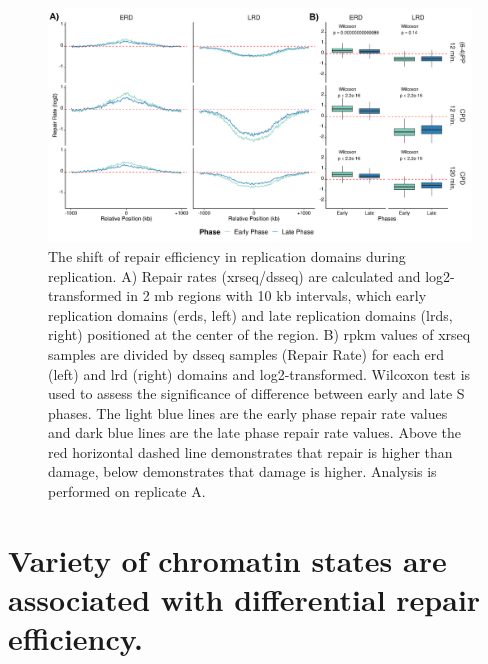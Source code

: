 \begin{figure}[H]
    \begin{center}
    \includegraphics[width=\textwidth]{Chapters/4_results/figures/fig2}
    \caption[The shift of repair efficiency in replication domains during replication.]{The shift of repair efficiency in replication domains during replication. A) Repair rates (\gls{xrseq}/\gls{dsseq}) are calculated and log2-transformed in 2 \gls{mb} regions with 10 \gls{kb} intervals, which early replication domains (\gls{erd}s, left) and late replication domains (\gls{lrd}s, right) positioned at the center of the region. B) \gls{rpkm} values of \gls{xrseq} samples are divided by \gls{dsseq} samples (Repair Rate) for each \gls{erd} (left) and \gls{lrd} (right) domains and log2-transformed. Wilcoxon test is used to assess the significance of difference between early and late S phases. The light blue lines are the early phase repair rate values and dark blue lines are the late phase repair rate values. Above the red horizontal dashed line demonstrates that repair is higher than damage, below demonstrates that damage is higher. Analysis is performed on replicate A.}
    \label{fig:repdomain}
    \end{center}
    \end{figure}

\section{Variety of chromatin states are associated with differential repair efficiency.}

